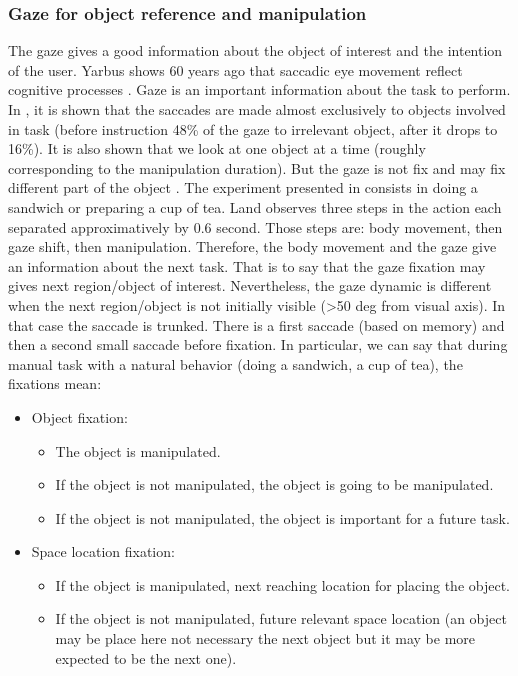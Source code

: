 \documentclass[11pt,a4paper]{article}
\begin{document}
\subsubsection{Gaze for object reference and manipulation}
The gaze gives a good information about the object of interest and the intention of the user. Yarbus shows 60 years ago that saccadic eye movement reflect cognitive processes \cite{Yarbus1967}. Gaze is an important information about the task to perform. In \cite{Land2009}, it is shown that the saccades are made almost exclusively to objects involved in task (before instruction 48\% of the gaze to irrelevant object, after it drops to 16\%). It is also shown that we look at one object at a time (roughly corresponding to the manipulation duration). But the gaze is not fix and may fix different part of the object \cite{Land2009}. The experiment presented in \cite{Land2009} consists in doing a sandwich or preparing a cup of tea. Land observes three steps in the action each separated approximatively by 0.6 second. Those steps are: body movement, then gaze shift, then manipulation. Therefore, the body movement and the gaze give an information about the next task. That is to say that the gaze fixation may gives next region/object of interest. Nevertheless, the gaze dynamic is different when the next region/object is not initially visible (>50 deg from visual axis). In that case the saccade is trunked. There is a first saccade (based on memory) and then a second small saccade before fixation. In particular, we can say that during manual task with a natural behavior (doing a sandwich, a cup of tea), the fixations mean:
\begin{itemize}
\item Object fixation: 
\begin{itemize}
\item The object is manipulated.
\item If the object is not manipulated, the object is going to be manipulated.
\item If the object is not manipulated, the object is important for a future task.
\end{itemize}
\item Space location fixation:
\begin{itemize}
\item If the object is manipulated, next reaching location for placing the object.
\item If the object is not manipulated, future relevant space location (an object may be place here not necessary the next object but it may be more expected to be the next one).
\end{itemize}
\end{itemize}
\end{document}
